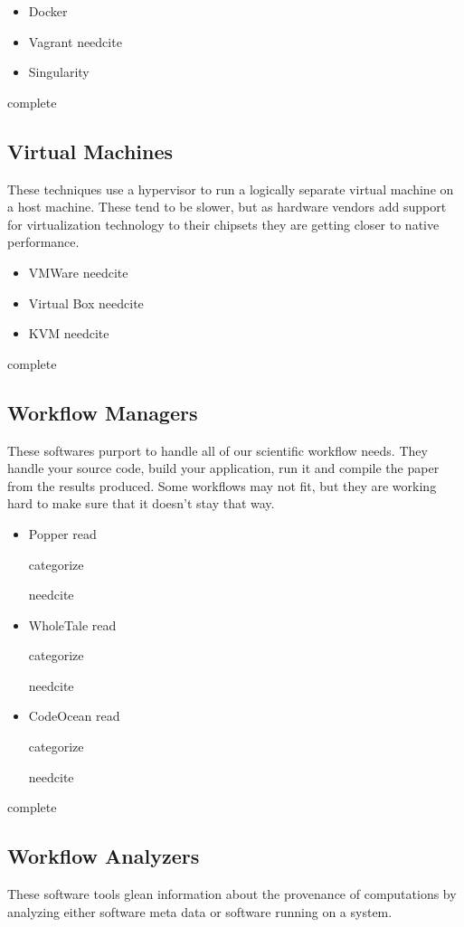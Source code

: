 \documentclass{article}
\newcommand{\Read}{
	\gls{read}
}
\newcommand{\categorize}{
	\gls{categorize}
}
\newcommand{\complete}{
	\gls{complete}
}
\newcommand{\needcite}{
	\gls{needcite}
}
\begin{document}
\begin{itemize}
\item Docker \cite{Docker}
\item Vagrant \needcite
\item Singularity \cite{Singularity}
\end{itemize}

\complete

\subsection{Virtual Machines}

These techniques use a hypervisor to run a logically separate virtual machine on a host machine. These tend to be slower, but as hardware vendors add support for virtualization technology to their chipsets they are getting closer to native performance.

\begin{itemize}
\item VMWare \needcite
\item Virtual Box \needcite
\item KVM \needcite
\end{itemize}

\complete

\subsection{Workflow Managers}

These softwares purport to handle all of our scientific workflow needs. They handle your source code, build your application, run it and compile the paper from the results produced. Some workflows may not fit, but they are working hard to make sure that it doesn't stay that way.

\begin{itemize}
\item Popper \Read \categorize \needcite
\item WholeTale \Read \categorize \needcite
\item CodeOcean \Read \categorize \needcite
\end{itemize}

\complete

\subsection{Workflow Analyzers}

These software tools glean information about the provenance of computations by analyzing either software meta data or software running on a system.
\end{document}
